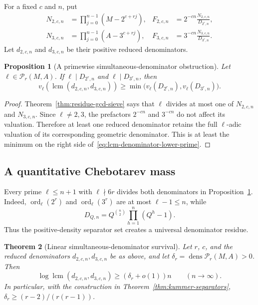 \documentclass[11pt,oneside]{article}
\newtheorem{theorem}{Theorem}[section]
\newtheorem{proposition}[theorem]{Proposition}
\theoremstyle{definition}
\theoremstyle{remark}
\newcommand{\ord}{\operatorname{ord}}
\newcommand{\lcm}{\operatorname{lcm}}
\newcommand{\dens}{\operatorname{dens}}
\begin{document}
For a fixed $c$ and $n$, put
\begin{align*}
 N_{2,c,n}&=\prod_{j=0}^{n-1}(M-2^{c+rj}),
 &F_{2,c,n}&=2^{-cn}\frac{N_{2,c,n}}{D_{2^r,n}},\\
 N_{3,c,n}&=\prod_{j=0}^{n-1}(A-3^{c+rj}),
 &F_{3,c,n}&=3^{-cn}\frac{N_{3,c,n}}{D_{3^r,n}}.
\end{align*}
Let $d_{2,c,n}$ and $d_{3,c,n}$ be their positive reduced denominators.

\begin{proposition}[A primewise simultaneous-denominator obstruction]
\label{prop:primewise-denominator}
Let $\ell\in\mathcal P_r(M,A)$.  If
$\ell\mid D_{2^r,n}$ and $\ell\mid D_{3^r,n}$, then
\begin{equation}
 v_\ell\!\left(\lcm(d_{2,c,n},d_{3,c,n})\right)
 \ge
 \min\bigl(v_\ell(D_{2^r,n}),v_\ell(D_{3^r,n})\bigr).
 \label{eq:lcm-denominator-lower-prime}
\end{equation}
\end{proposition}

\begin{proof}
Theorem~\ref{thm:residue-gcd-sieve} says that $\ell$ divides at most one of
$N_{2,c,n}$ and $N_{3,c,n}$.  Since $\ell\ne2,3$, the prefactors $2^{-cn}$ and $3^{-cn}$ do
not affect its valuation.  Therefore at least one reduced denominator retains the full
$\ell$-adic valuation of its corresponding geometric denominator.  This is at least the
minimum on the right side of~\eqref{eq:lcm-denominator-lower-prime}.
\end{proof}

\subsection{A quantitative Chebotarev mass}

Every prime $\ell\le n+1$ with $\ell\nmid6r$ divides both denominators in
Proposition~\ref{prop:primewise-denominator}.  Indeed,
$\ord_\ell(2^r)$ and $\ord_\ell(3^r)$ are at most $\ell-1\le n$, while
\[
 D_{Q,n}=Q^{\binom n2}\prod_{h=1}^n(Q^h-1).
\]
Thus the positive-density separator set creates a universal denominator residue.

\begin{theorem}[Linear simultaneous-denominator survival]
\label{thm:linear-denominator-mass}
Let $r$, $c$, and the reduced denominators $d_{2,c,n},d_{3,c,n}$ be as above, and let
$\delta_r=\dens\mathcal P_r(M,A)>0$.  Then
\begin{equation}
 \log\lcm(d_{2,c,n},d_{3,c,n})
 \ge (\delta_r+o(1))n
 \qquad(n\to\infty).
 \label{eq:linear-denominator-mass}
\end{equation}
In particular, with the construction in Theorem~\ref{thm:kummer-separators},
$\delta_r\ge(r-2)/(r(r-1))$.
\end{theorem}
\end{document}
